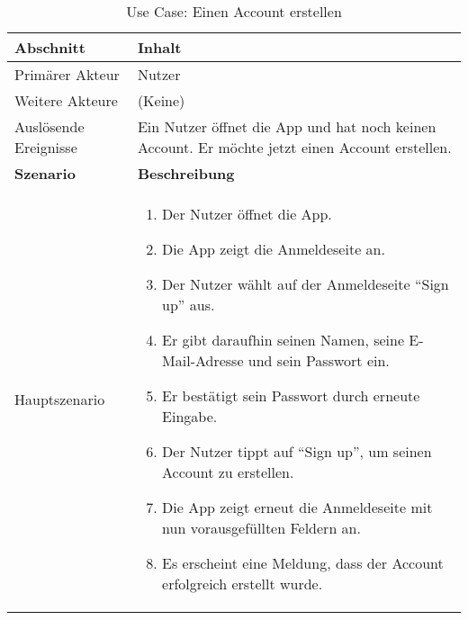 \begin{table}[H]
	\footnotesize
	\caption{Use Case: Einen Account erstellen}
	\begin{tabularx}{0.95\textwidth}{ |l|X| }
		\hline
		\rowcolor{gray} \textbf{Abschnitt}     & \textbf{Inhalt}                                                                                                                                       \\
		\hline
		Primärer Akteur                        & Nutzer                                                                                                                                                \\
		\hline
		Weitere Akteure                        & (Keine)                                                                                                                                               \\
		\hline
		Auslösende Ereignisse                  & Ein Nutzer öffnet die App und hat noch keinen Account. Er möchte jetzt einen Account erstellen.                                                       \\
		\hline
		\rowcolor{lightgray} \textbf{Szenario} & \textbf{Beschreibung}                                                                                                                                 \\
		\hline
		Hauptszenario                          & \begin{enumerate}[noitemsep]
			                                         \item Der Nutzer öffnet die App.
			                                         \item Die App zeigt die Anmeldeseite an.
			                                         \item Der Nutzer wählt auf der Anmeldeseite \enquote{Sign up} aus.
			                                         \item Er gibt daraufhin seinen Namen, seine E-Mail-Adresse und sein Passwort ein.
			                                         \item Er bestätigt sein Passwort durch erneute Eingabe.
			                                         \item Der Nutzer tippt auf \enquote{Sign up}, um seinen Account zu erstellen.
			                                         \item Die App zeigt erneut die Anmeldeseite mit nun vorausgefüllten Feldern an.
			                                         \item Es erscheint eine Meldung, dass der Account erfolgreich erstellt wurde.

\end{enumerate}
\end{tabularx}
\end{table}
